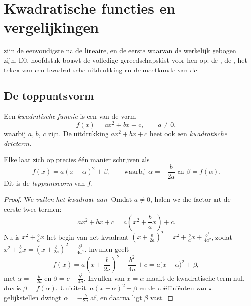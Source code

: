 \chapter{Kwadratische functies en vergelijkingen}\label{ch:g11:quad}

 zijn de eenvoudigste  na de lineaire, en de
eerste waarvan de  werkelijk gebogen zijn. Dit hoofdstuk bouwt de
volledige gereedschapskist voor hen op: de , de , het
teken van een kwadratische uitdrukking en de meetkunde van de .

\section{De toppuntsvorm}

\begin{definition}\label{def:g11:quad:quadratic}
Een \emph{kwadratische functie} is een 
van de vorm
\[
f(x) = ax^2 + bx + c, \qquad a \neq 0,
\]
waarbij $a$, $b$, $c$  zijn. De uitdrukking $ax^2 + bx + c$
heet ook een \emph{kwadratische drieterm}.
\end{definition}

\begin{theorem}[Toppuntsvorm]\label{thm:g11:quad:canonical}
Elke  laat zich op precies één manier schrijven als
\[
f(x) = a(x - \alpha)^2 + \beta,
\qquad\text{waarbij } \alpha = -\frac{b}{2a} \text{ en } \beta = f(\alpha).
\]
Dit is de \emph{toppuntsvorm} van $f$.
\end{theorem}

\begin{proof}
We \emph{vullen het kwadraat aan}. Omdat $a \neq 0$, halen we die factor uit
de eerste twee termen:
\[
ax^2 + bx + c = a\left(x^2 + \frac{b}{a}x\right) + c .
\]
Nu is $x^2 + \frac{b}{a}x$ het begin van het kwadraat
$\left(x + \frac{b}{2a}\right)^2 = x^2 + \frac ba x + \frac{b^2}{4a^2}$,
zodat $x^2 + \frac{b}{a}x = \left(x + \frac{b}{2a}\right)^2 -
\frac{b^2}{4a^2}$. Invullen geeft
\[
f(x) = a\left(x + \frac{b}{2a}\right)^2 - \frac{b^2}{4a} + c
= a\bigl(x - \alpha\bigr)^2 + \beta,
\]
met $\alpha = -\frac{b}{2a}$ en $\beta = c - \frac{b^2}{4a}$. Invullen van
$x = \alpha$ maakt de kwadratische term nul, dus is $\beta = f(\alpha)$.
Uniciteit: $a(x-\alpha)^2 + \beta$  en de coëfficiënten van $x$
gelijkstellen dwingt $\alpha = -\frac{b}{2a}$ af, en daarna ligt $\beta$
vast.
\end{proof}

